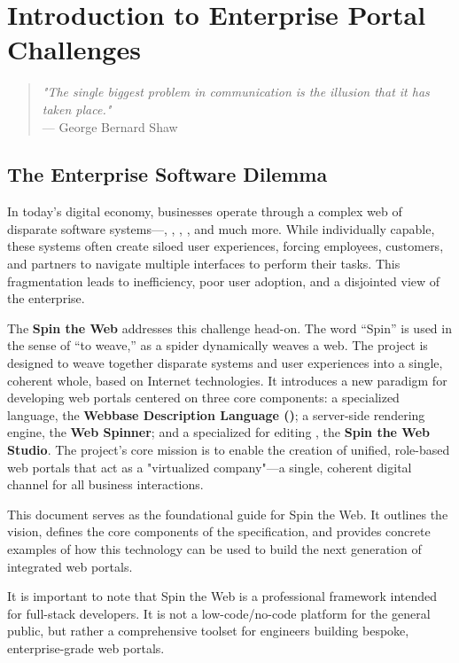 
\chapter{Introduction to Enterprise Portal Challenges}
\label{chap:intro}

\begin{quote}
\textit{"The single biggest problem in communication is the illusion that it has taken place."} \\
— George Bernard Shaw
\end{quote}

\section{The Enterprise Software Dilemma}
\label{sec:enterprise-dilemma}

In today's digital economy, businesses operate through a complex web of disparate software systems—, , , , and much more. While individually capable, these systems often create siloed user experiences, forcing employees, customers, and partners to navigate multiple interfaces to perform their tasks. This fragmentation leads to inefficiency, poor user adoption, and a disjointed view of the enterprise.

The \textbf{Spin the Web} addresses this challenge head-on. The word ``Spin'' is used in the sense of ``to weave,'' as a spider dynamically weaves a web. The project is designed to weave together disparate systems and user experiences into a single, coherent whole, based on Internet technologies. It introduces a new paradigm for developing web portals centered on three core components: a specialized language, the \textbf{Webbase Description Language (\wbdl{})}; a server-side rendering engine, the \textbf{Web Spinner}; and a specialized \webbaselet{} for editing , the \textbf{Spin the Web Studio}. The project's core mission is to enable the creation of unified, role-based web portals that act as a "virtualized company"—a single, coherent digital channel for all business interactions.

This document serves as the foundational guide for Spin the Web. It outlines the vision, defines the core components of the \wbdl{} specification, and provides concrete examples of how this technology can be used to build the next generation of integrated web portals.

It is important to note that Spin the Web is a professional framework intended for full-stack developers. It is not a low-code/no-code platform for the general public, but rather a comprehensive toolset for engineers building bespoke, enterprise-grade web portals.

